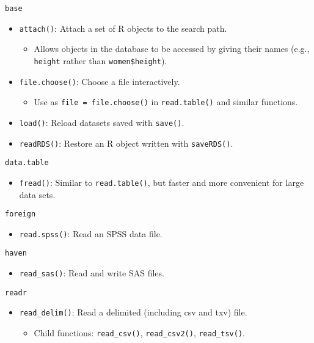 \documentclass[]{book}
\providecommand{\tightlist}{%
  \setlength{\itemsep}{0pt}\setlength{\parskip}{0pt}}
\theoremstyle{definition}
\theoremstyle{definition}
\theoremstyle{definition}
\theoremstyle{remark}
\begin{document}
\texttt{base}

\begin{itemize}
\tightlist
\item
  \texttt{attach()}: Attach a set of R objects to the search path.

  \begin{itemize}
  \tightlist
  \item
    Allows objects in the database to be accessed by giving their names
    (e.g., \texttt{height} rather than \texttt{women\$height}).
  \end{itemize}
\item
  \texttt{file.choose()}: Choose a file interactively.

  \begin{itemize}
  \tightlist
  \item
    Use as \texttt{file\ =\ file.choose()} in \texttt{read.table()} and
    similar functions.
  \end{itemize}
\item
  \texttt{load()}: Reload datasets saved with \texttt{save()}.
\item
  \texttt{readRDS()}: Restore an R object written with
  \texttt{saveRDS()}.
\end{itemize}

\texttt{data.table}

\begin{itemize}
\tightlist
\item
  \texttt{fread()}: Similar to \texttt{read.table()}, but faster and
  more convenient for large data sets.
\end{itemize}

\texttt{foreign}

\begin{itemize}
\tightlist
\item
  \texttt{read.spss()}: Read an SPSS data file.
\end{itemize}

\texttt{haven}

\begin{itemize}
\tightlist
\item
  \texttt{read\_sas()}: Read and write SAS files.
\end{itemize}

\texttt{readr}

\begin{itemize}
\tightlist
\item
  \texttt{read\_delim()}: Read a delimited (including csv and txv) file.

  \begin{itemize}
  \tightlist
  \item
    Child functions: \texttt{read\_csv()}, \texttt{read\_csv2()},
    \texttt{read\_tsv()}.
  \end{itemize}
\end{itemize}
\end{document}
